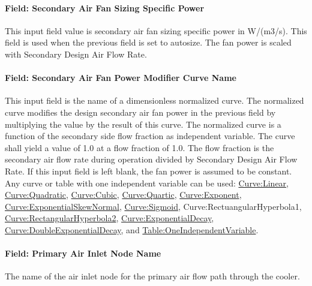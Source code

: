 \paragraph{Field: Secondary Air Fan Sizing Specific Power}\label{field-secondary-air-fan-sizing-specific-power}

This input field value is secondary air fan sizing specific power in W/(m3/s). This field is used when the previous field is set to autosize. The fan power is scaled with Secondary Design Air Flow Rate.

\paragraph{Field: Secondary Air Fan Power Modifier Curve Name}\label{field-secondary-air-fan-power-modifier-curve-name}

This input field is the name of a dimensionless normalized curve. The normalized curve modifies the design secondary air fan power in the previous field by multiplying the value by the result of this curve. The normalized curve is a function of the secondary side flow fraction as independent variable. The curve shall yield a value of 1.0 at a flow fraction of 1.0. The flow fraction is the secondary air flow rate during operation divided by Secondary Design Air Flow Rate. If this input field is left blank, the fan power is assumed to be constant. Any curve or table with one independent variable can be used: \hyperref[curvelinear]{Curve:Linear}, \hyperref[curvequadratic]{Curve:Quadratic}, \hyperref[curvecubic]{Curve:Cubic}, \hyperref[curvequartic]{Curve:Quartic}, \hyperref[curveexponent]{Curve:Exponent}, \hyperref[curveexponentialskewnormal]{\hyperref[curveexponent]{Curve:Exponent}ialSkewNormal}, \hyperref[curvesigmoid]{Curve:Sigmoid}, Curve:RectuangularHyperbola1, \hyperref[curverectangularhyperbola2]{Curve:RectangularHyperbola2}, \hyperref[curveexponentialdecay]{\hyperref[curveexponent]{Curve:Exponent}ialDecay}, \hyperref[curvedoubleexponentialdecay]{Curve:DoubleExponentialDecay}, and \hyperref[tableoneindependentvariable]{Table:OneIndependentVariable}.

\paragraph{Field: Primary Air Inlet Node Name}\label{field-primary-air-inlet-node-name-2}

The name of the air inlet node for the primary air flow path through the cooler.

